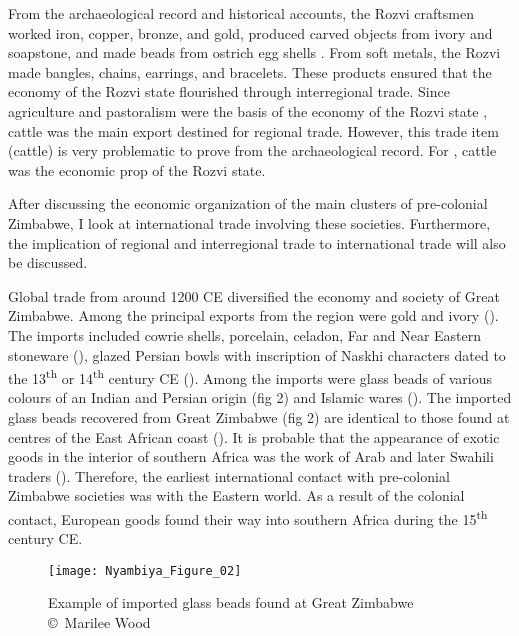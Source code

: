 From the archaeological record and historical accounts, the Rozvi craftsmen worked iron, copper, bronze, and gold, produced carved objects  from ivory and soapstone, and made beads from ostrich egg shells \parencite{mudenge1974}.
From soft metals, the Rozvi made bangles, chains, earrings, and bracelets. These products ensured that the economy of the Rozvi state flourished through interregional trade. Since agriculture and pastoralism were the basis of the economy of the Rozvi state \parencite{mudenge1974}, cattle was the main export destined for regional trade. However, this trade item (cattle) is very problematic to prove from the archaeological record. For \textcite{mudenge1974}, cattle was the economic prop of the Rozvi state.

After discussing the economic organization of the main clusters of pre-colonial Zimbabwe, I  look at international trade involving these societies. Furthermore, the implication of regional and interregional trade to international trade will also be discussed.

Global trade from around 1200 CE diversified the economy and society of Great Zimbabwe.  Among the principal exports from the region were gold and ivory (\cites{mudenge1988}{pwiti2005}{pikirayi2006}). The imports included cowrie shells, porcelain, celadon, Far and Near Eastern stoneware (\cites{garlake1973}{garlake1982}{pikirayi2006}), glazed Persian bowls with inscription of Naskhi characters dated to the 13\textsuperscript{th} or 14\textsuperscript{th} century CE (\cites{garlake1973}). Among the imports were glass beads of various colours of an Indian and Persian origin (fig 2) and Islamic wares (\cites{huffman1972}{huffman2000}{kim2008}{chirikure2008}). The imported glass beads recovered from Great Zimbabwe (fig 2) are identical to those found at centres of the East African coast (\cites{chirikure2008}{kusimba2017}). It is probable that the appearance of exotic goods in the interior of southern
Africa was the work of Arab and later Swahili traders (\cites{kusimba1999}[][22]{ndoro2001}).
Therefore, the earliest international contact with pre-colonial Zimbabwe societies was with the Eastern world. As a result of the colonial contact, European goods found their way into southern Africa during the 15\textsuperscript{th} century CE.

\begin{figure}[!tb]
	\texttt{[image: Nyambiya\_Figure\_02]}
	\caption{Example of imported glass beads found at Great Zimbabwe
		{\normalfont\scriptsize \\ \copyright\ Marilee Wood
	}}
	\label{fig:Nyambiya_Figure_02}
\end{figure}


